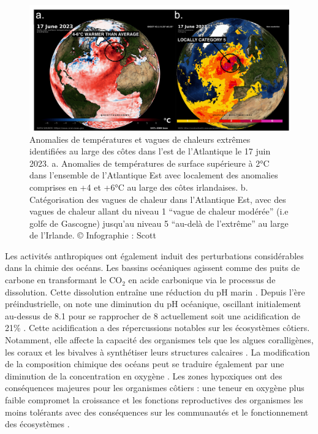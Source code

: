 \begin{refsection}
\begin{figure}
\hypertarget{fig:intro3}{%
\centering
\includegraphics{02-Introduction/figures/marine_heatwaves.png}
\caption[Anomalies de températures et vagues de chaleurs extrêmes
identifiées au large des côtes dans l'est de l'Atlantique le 17 juin
2023]{Anomalies de températures et vagues de chaleurs extrêmes
identifiées au large des côtes dans l'est de l'Atlantique le 17 juin
2023. a. Anomalies de températures de surface supérieure à 2°C dans
l'ensemble de l'Atlantique Est avec localement des anomalies comprises
en +4 et +6°C au large des côtes irlandaises. b. Catégorisation des
vagues de chaleur dans l'Atlantique Est, avec des vagues de chaleur
allant du niveau 1 ``vague de chaleur modérée'' (i.e golfe de Gascogne)
jusqu'au niveau 5 ``au-delà de l'extrême'' au large de l'Irlande. ©
Infographie : Scott \textcite{Duncan}}\label{fig:intro3}
}
\end{figure}

Les activités anthropiques ont également induit des perturbations
considérables dans la chimie des océans. Les bassins océaniques agissent
comme des puits de carbone en transformant le CO\(_\text{2}\) en acide
carbonique via le processus de dissolution. Cette dissolution entraîne
une réduction du pH marin \autocite{ipcccarbonbiogeochem_2021}. Depuis
l'ère préindustrielle, on note une diminution du pH océanique, oscillant
initialement au-dessus de 8.1 pour se rapprocher de 8 actuellement soit
une acidification de 21\% \autocite{ipcccarbonbiogeochem_2021}. Cette
acidification a des répercussions notables sur les écosystèmes côtiers.
Notamment, elle affecte la capacité des organismes tels que les algues
coralligènes, les coraux et les bivalves à synthétiser leurs structures
calcaires \autocites[ ]{Chan_2013}[ ]{Kuffner_2008}{Zhao_2017}. La
modification de la composition chimique des océans peut se traduire
également par une diminution de la concentration en oxygène \autocites[
]{Schmidtko_2017}{Breitburg_2018}. Les zones hypoxiques ont des
conséquences majeures pour les organismes côtiers : une teneur en
oxygène plus faible compromet la croissance et les fonctions
reproductives des organismes les moins tolérants avec des conséquences
sur les communautés et le fonctionnement des écosystèmes
\autocite{Limburg_2020}.


\end{refsection}
